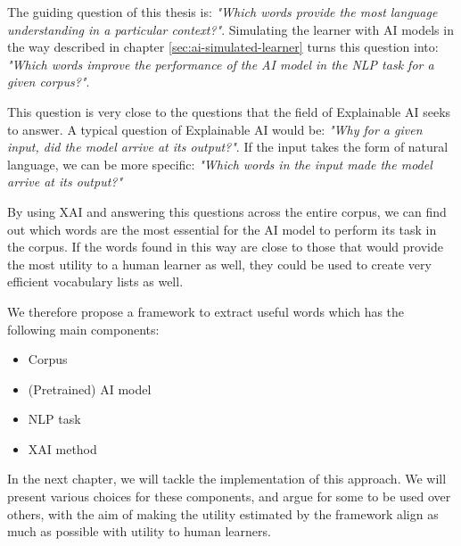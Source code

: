 The guiding question of this thesis is:
\textit{"Which words provide the most language understanding in a particular context?"}.
Simulating the learner with AI models in the way described in chapter \ref{sec:ai-simulated-learner} turns this question into:
\textit{"Which words improve the performance of the AI model in the NLP task for a given corpus?"}.

This question is very close to the questions that the field of Explainable AI seeks to answer.
A typical question of Explainable AI would be:
\textit{"Why for a given input, did the model arrive at its output?"}.
If the input takes the form of natural language, we can be more specific:
\textit{"Which words in the input made the model arrive at its output?"}

By using XAI and answering this questions across the entire corpus, we can find out which words are the most essential for the AI model to perform its task in the corpus.
If the words found in this way are close to those that would provide the most utility to a human learner as well, they could be used to create very efficient vocabulary lists as well.


We therefore propose a framework to extract useful words which has the following main components:
\begin{itemize}
	\item Corpus
	\item (Pretrained) AI model
	\item NLP task
	\item XAI method
\end{itemize}


In the next chapter, we will tackle the implementation of this approach.
We will present various choices for these components, and argue for some to be used over others, with the aim of making the utility estimated by the framework align as much as possible with utility to human learners.

%
%

